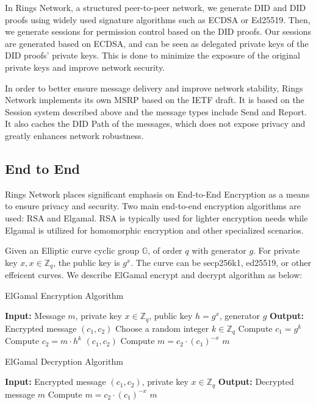 \documentclass[twocolumn]{article}
\begin{document}
In Rings Network, a structured peer-to-peer network, we generate DID and DID proofs using widely used signature algorithms such as ECDSA or Ed25519. Then, we generate sessions for permission control based on the DID proofs. Our sessions are generated based on ECDSA, and can be seen as delegated private keys of the DID proofs' private keys. This is done to minimize the exposure of the original private keys and improve network security.

In order to better ensure message delivery and improve network stability, Rings Network implements its own MSRP based on the IETF draft. It is based on the Session system described above and the message types include Send and Report. It also caches the DID Path of the messages, which does not expose privacy and greatly enhances network robustness.

\subsection{End to End}

Rings Network places significant emphasis on End-to-End Encryption as a means to ensure privacy and security. Two main end-to-end encryption algorithms are used: RSA and Elgamal. RSA is typically used for lighter encryption needs while Elgamal is utilized for homomorphic encryption and other specialized scenarios.

Given an Elliptic curve cyclic group $\mathbb{G}$, of order $𝑞$ with generator $𝑔$. For private key $x, x\in\mathbb{Z}_q$, the public key is $g^x$. The curve can be secp256k1, ed25519, or other effeicent curves. We describe ElGamal encrypt and decrypt algorithm as below:

\begin{algorithm}[h]
\caption{ElGamal Encryption Algorithm}
\label{ElGamal Encryption}
\begin{algorithmic}[1]
\State \textbf{Input:} Message $m$, private key $x \in \mathbb{Z}_q$, public key $h = g^x$, generator $g$
\State \textbf{Output:} Encrypted message $(c_1, c_2)$
\State Choose a random integer $k \in \mathbb{Z}_q$
\State Compute $c_1 = g^k$
\State Compute $c_2 = m\cdot h^k$
\State \Return $(c_1, c_2)$
\EndProcedure
{}
\State Compute $m = c_2\cdot(c_1)^{-x}$
\State \Return $m$
\EndProcedure
\end{algorithmic}
\end{algorithm}

\begin{algorithm}[htpb]
\caption{ElGamal Decryption Algorithm}
\label{ElGamal Decryption}
\begin{algorithmic}[1]
\State \textbf{Input:} Encrypted message $(c_1, c_2)$, private key $x \in \mathbb{Z}_q$
\State \textbf{Output:} Decrypted message $m$
\State Compute $m = c_2\cdot(c_1)^{-x}$
\State \Return $m$
\EndProcedure
\end{algorithmic}
\end{algorithm}
\end{document}

